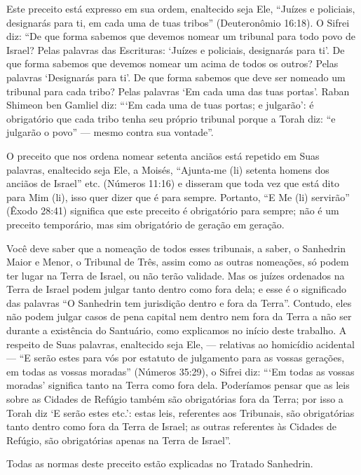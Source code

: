 Este preceito está expresso em sua ordem, enaltecido seja Ele, ``Juízes
e policiais, designarás para ti, em cada uma de tuas tribos''
(Deuteronômio 16:18). O Sifrei diz: ``De que forma sabemos que devemos
nomear um tribunal para todo povo de Israel? Pelas palavras das
Escrituras: `Juízes e policiais, designarás para ti'. De que forma
sabemos que devemos nomear um acima de todos os outros? Pelas palavras `Designarás para ti'. De que forma sabemos
que deve ser nomeado um tribunal para cada tribo? Pelas palavras `Em
cada uma das tuas portas'. Raban Shimeon ben Gamliel diz: ```Em cada uma
de tuas portas; e julgarão': é obrigatório que cada tribo tenha seu
próprio tribunal porque a Torah diz: ``e julgarão o povo'' --- mesmo
contra sua vontade''.

O preceito que nos ordena nomear setenta anciãos está repetido em Suas
palavras, enaltecido seja Ele, a Moisés, ``Ajunta-me (li) setenta homens
dos anciãos de Israel'' etc. (Números 11:16) e disseram que toda vez
que está dito para Mim (li), isso quer dizer que é para sempre.
Portanto, ``E Me (li) servirão'' (Êxodo 28:41) significa que este
preceito é obrigatório para sempre; não é um preceito temporário, mas
sim obrigatório de geração em geração.

Você deve saber que a nomeação de todos esses tribunais, a saber, o
Sanhedrin Maior e Menor, o Tribunal de Três, assim como as outras
nomeações, só podem ter lugar na Terra de Israel, ou não terão
validade. Mas os juízes ordenados na Terra de Israel podem julgar tanto
dentro como fora dela; e esse é o significado das palavras ``O Sanhedrin
tem jurisdição dentro e fora da Terra''. Contudo, eles não podem julgar
casos de pena capital nem dentro nem fora da Terra a não ser durante a
existência do Santuário, como explicamos no início deste trabalho. A
respeito de Suas palavras, enaltecido seja Ele, --- relativas ao
homicídio acidental --- ``E serão estes para vós por estatuto de
julgamento para as vossas gerações, em todas as vossas moradas''
(Números 35:29), o Sifrei diz: ```Em todas as vossas moradas' significa
tanto na Terra como fora dela. Poderíamos pensar que as leis sobre as
Cidades de Refúgio também são obrigatórias fora da Terra; por isso a
Torah diz `E serão estes etc.': estas leis, referentes aos Tribunais,
são obrigatórias tanto dentro como fora da Terra de Israel; as outras
referentes às Cidades de Refúgio, são obrigatórias apenas na Terra de
Israel''.

Todas as normas deste preceito estão explicadas no Tratado Sanhedrin.

